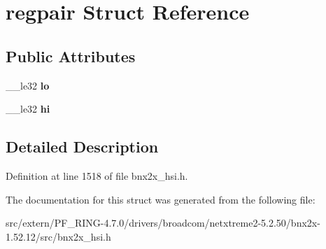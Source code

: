 \hypertarget{structregpair}{
\section{regpair Struct Reference}
\label{structregpair}
}
\subsection*{Public Attributes}
\begin{DoxyCompactItemize}
\item 
\hypertarget{structregpair_ae290b244f8fbb02e5bd197c0b49b615e}{
\_\-\_\-le32 {\bfseries lo}}
\label{structregpair_ae290b244f8fbb02e5bd197c0b49b615e}

\item 
\hypertarget{structregpair_afc41d0e75d3d2484da87103b2af4df3f}{
\_\-\_\-le32 {\bfseries hi}}
\label{structregpair_afc41d0e75d3d2484da87103b2af4df3f}

\end{DoxyCompactItemize}


\subsection{Detailed Description}


Definition at line 1518 of file bnx2x\_\-hsi.h.



The documentation for this struct was generated from the following file:\begin{DoxyCompactItemize}
\item 
src/extern/PF\_\-RING-\/4.7.0/drivers/broadcom/netxtreme2-\/5.2.50/bnx2x-\/1.52.12/src/bnx2x\_\-hsi.h\end{DoxyCompactItemize}
